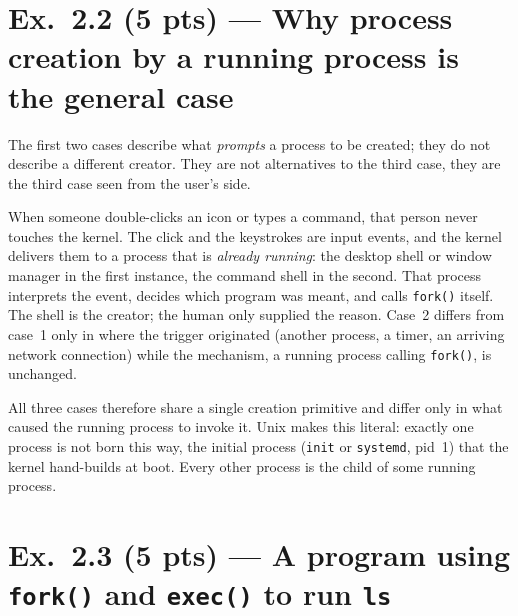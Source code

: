 \section*{Ex.~2.2 (5 pts) --- Why process creation by a running process is the general case}

The first two cases describe what \emph{prompts} a process to be created; they do
not describe a different creator. They are not alternatives to the third case, they
are the third case seen from the user's side.

When someone double-clicks an icon or types a command, that person never touches the
kernel. The click and the keystrokes are input events, and the kernel delivers them
to a process that is \emph{already running}: the desktop shell or window manager in
the first instance, the command shell in the second. That process interprets the
event, decides which program was meant, and calls \texttt{fork()} itself. The shell
is the creator; the human only supplied the reason. Case~2 differs from case~1 only
in where the trigger originated (another process, a timer, an arriving network
connection) while the mechanism, a running process calling \texttt{fork()}, is
unchanged.

All three cases therefore share a single creation primitive and differ only in what
caused the running process to invoke it. Unix makes this literal: exactly one process
is not born this way, the initial process (\texttt{init} or \texttt{systemd}, pid~1)
that the kernel hand-builds at boot. Every other process is the child of some running
process.

\section*{Ex.~2.3 (5 pts) --- A program using \texttt{fork()} and \texttt{exec()} to run \texttt{ls}}


